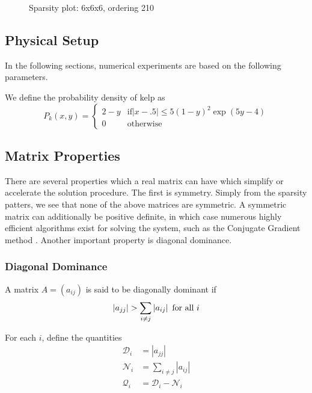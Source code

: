 \documentclass[10pt]{article}
\newcommand\DD{\mathcal{D}}
\newcommand\QQ{\mathcal{Q}}
\newcommand\NN{\mathcal{N}}
\newcommand\abs[1]{\left| #1 \right|}
\begin{document}
\begin{multicols}{2}
\begin{center}
\begin{minipage}[t]{.5\textwidth}
\begin{figure}[H]
    \caption{Sparsity plot: 6x6x6, ordering 210 }
\end{figure}
\end{minipage}%
\end{center}
\pagebreak


\subsection{Physical Setup}
In the following sections, numerical experiments are based on the following parameters.

We define the probability density of kelp as 
\begin{equation}
	P_k(x,y) =
	\begin{cases}
		2-y & \mbox{if} \abs{x-.5} \leq 5(1-y)^2\exp(5y-4) \\
		0 & \mbox{otherwise}
	\end{cases}
\end{equation}

\subsection{Matrix Properties}
There are several properties which a real matrix can have which simplify or accelerate the solution procedure.
The first is symmetry.
Simply from the sparsity patters, we see that none of the above matrices are symmetric.
A symmetric matrix can additionally be positive definite, in which case numerous highly efficient algorithms exist for solving the system, such as the Conjugate Gradient method \citep{nocedal_numerical_1999}.
Another important property is diagonal dominance.

\subsubsection{Diagonal Dominance}
\label{sec:ddom}

A matrix $A=(a_{ij})$ is said to be diagonally dominant if
\begin{equation}
	\abs{a_{jj}} > \sum_{i\neq j}\abs{a_{ij}} \,\, \mbox{for all}\,\, i \\
\end{equation}

For each $i$, define the quantities
\begin{align}
	\DD_i &= \abs{a_{jj}} \\
	\NN_i &= \sum_{i\neq j}\abs{a_{ij}} \\
	\QQ_i &= \DD_i - \NN_i
\end{align}


\end{multicols}
\end{document}
